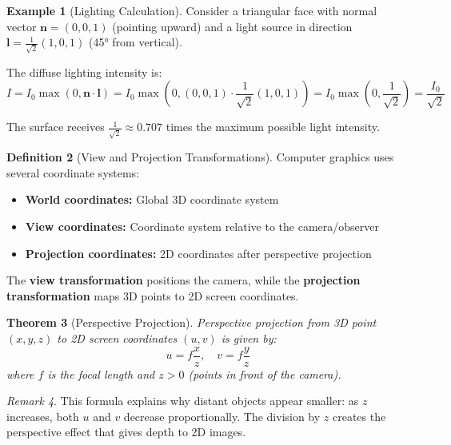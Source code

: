 \documentclass[12pt]{article}
\numberwithin{equation}{section}
\newcommand{\vect}[1]{\boldsymbol{#1}}   %
\theoremstyle{plain}
\newtheorem{theorem}{Theorem}[section]
\theoremstyle{definition}
\newtheorem{definition}[theorem]{Definition}
\newtheorem{example}[theorem]{Example}
\theoremstyle{remark}
\newtheorem{remark}[theorem]{Remark}
\begin{document}
\begin{example}[Lighting Calculation]
Consider a triangular face with normal vector $\vect{n} = (0, 0, 1)$ (pointing upward) and a light source in direction $\vect{l} = \frac{1}{\sqrt{2}}(1, 0, 1)$ (45° from vertical).

The diffuse lighting intensity is:
$$I = I_0 \max(0, \vect{n} \cdot \vect{l}) = I_0 \max\left(0, (0, 0, 1) \cdot \frac{1}{\sqrt{2}}(1, 0, 1)\right) = I_0 \max\left(0, \frac{1}{\sqrt{2}}\right) = \frac{I_0}{\sqrt{2}}$$

The surface receives $\frac{1}{\sqrt{2}} \approx 0.707$ times the maximum possible light intensity.
\end{example}

\begin{definition}[View and Projection Transformations]
Computer graphics uses several coordinate systems:
\begin{itemize}
\item \textbf{World coordinates:} Global 3D coordinate system
\item \textbf{View coordinates:} Coordinate system relative to the camera/observer
\item \textbf{Projection coordinates:} 2D coordinates after perspective projection
\end{itemize}

The \textbf{view transformation} positions the camera, while the \textbf{projection transformation} maps 3D points to 2D screen coordinates.
\end{definition}

\begin{theorem}[Perspective Projection]
Perspective projection from 3D point $(x, y, z)$ to 2D screen coordinates $(u, v)$ is given by:
$$u = f \frac{x}{z}, \quad v = f \frac{y}{z}$$
where $f$ is the focal length and $z > 0$ (points in front of the camera).
\end{theorem}

\begin{remark}
This formula explains why distant objects appear smaller: as $z$ increases, both $u$ and $v$ decrease proportionally. The division by $z$ creates the perspective effect that gives depth to 2D images.
\end{remark}
\end{document}
